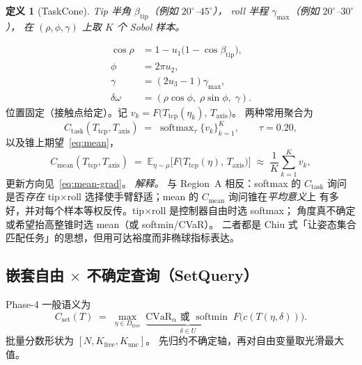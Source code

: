 \documentclass[UTF8,a4paper,11pt,fontset=fandol]{ctexart}
\newtheorem{definition}{定义}
\newcommand{\Tcp}{T_{\mathrm{tcp}}}
\newcommand{\Taxis}{T_{\mathrm{axis}}}
\newcommand{\softmin}{\operatorname{softmin}}
\newcommand{\softmax}{\operatorname{softmax}}
\newcommand{\CVaR}{\mathrm{CVaR}}
\begin{document}
\begin{definition}[TaskCone]
Tip 半角 \(\beta_{\mathrm{tip}}\)（例如 \(20^{\circ}\)--\(45^{\circ}\)），
roll 半程 \(\gamma_{\max}\)（例如 \(20^{\circ}\)--\(30^{\circ}\)），
在 \((\rho,\phi,\gamma)\) 上取 \(K\) 个 Sobol 样本。
\end{definition}
\begin{equation}
\label{eq:task-cone-sample}
\begin{aligned}
  \cos\rho
  &=
  1-u_{1}\bigl(1-\cos\beta_{\mathrm{tip}}\bigr),
  \\
  \phi
  &=
  2\pi u_{2},
  \\
  \gamma
  &=
  (2u_{3}-1)\gamma_{\max},
  \\
  \delta\omega
  &=
  (\rho\cos\phi,\;\rho\sin\phi,\;\gamma).
\end{aligned}
\end{equation}
位置固定（接触点给定）。记 \(v_{k}=F\bigl(\Tcp(\eta_{k}),\,\Taxis\bigr)\)。
两种常用聚合为
\begin{equation}
\label{eq:task-cone}
  C_{\mathrm{task}}(\Tcp,\Taxis)
  \;=\;
  \softmax_{\tau}
  \{v_{k}\}_{k=1}^{K},
  \qquad
  \tau=0.20,
\end{equation}
以及锥上期望~\eqref{eq:mean}，
\begin{equation}
\label{eq:task-cone-mean}
  C_{\mathrm{mean}}(\Tcp,\Taxis)
  \;=\;
  \mathbb{E}_{\eta\sim\mu}
  \bigl[
    F\bigl(\Tcp(\eta),\,\Taxis\bigr)
  \bigr]
  \;\approx\;
  \frac{1}{K}\sum_{k=1}^{K} v_{k},
\end{equation}
更新方向见~\eqref{eq:mean-grad}。
\emph{解释。}
与 Region~A 相反：softmax 的 \(C_{\mathrm{task}}\) 询问是否\emph{存在}
tip$\times$roll 选择使手臂舒适；mean 的 \(C_{\mathrm{mean}}\) 询问锥在\emph{平均意义}上
有多好，并对每个样本等权反传。tip$\times$roll 是控制器自由时选 softmax；
角度真不确定或希望抬高整锥时选 mean（或 softmin/CVaR）。
二者都是 Chiu 式「让姿态集合匹配任务」的思想，但用可达裕度而非椭球指标表达。

\subsection{\texorpdfstring{嵌套自由 $\times$ 不确定查询（SetQuery）}{嵌套自由 x 不确定查询（SetQuery）}}
\label{sec:set-query}

Phase-4 一般语义为
\begin{equation}
\label{eq:nested-semantic}
  C_{\mathrm{set}}(T)
  \;=\;
  \max_{\eta\in D_{\mathrm{free}}}
  \;
  \underbrace{
    \CVaR_{\alpha}\text{ 或 }\softmin
  }_{\delta\in U}
  \;
  F\bigl(c(T(\eta,\delta))\bigr).
\end{equation}
批量分数形状为 \([N,K_{\mathrm{free}},K_{\mathrm{unc}}]\)。
先归约不确定轴，再对自由变量取光滑最大值。
\end{document}
